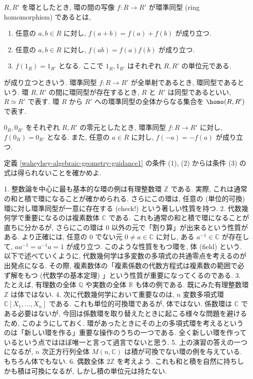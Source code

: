 \documentclass[openany, a4paper, oneside]{jsbook}
\begin{document}
\begin{defn}[環準同型]\label{waheyhey-algebraic-geometry-guidance1}
$R,R'$ を環としたとき, 環の間の写像 $f \colon R \to R'$ が環準同型 (ring homomorphism) であるとは,
\begin{enumerate}
\item 任意の $a,b \in R$ に対し, $f (a+b)=f (a) +f (b)$ が成り立つ.
\item 任意の $a,b\in R$ に対し, $f (ab)=f (a) f (b)$ が成り立つ.
\item $f (1_R)=1_{R'}$ となる.
ここで $1_R, 1_{R'}$ はそれぞれ $R, R'$ の単位元である.
\end{enumerate}
が成り立つときいう.
環準同型 $f \colon R \to R'$ が全単射であるとき, 環同型であるという.
環 $R,R'$ の間に環同型が存在するとき, $R$ と $R'$ は同型であるといい, $R \simeq R'$ で表す.
環 $R$ から $R'$ への環準同型の全体からなる集合を $\homo (R,R')$ で表す.
\end{defn}
\begin{exercise}
$0_R, 0_{R'}$ をそれぞれ $R, R'$ の零元としたとき,
環準同型 $f:R\to R'$ に対し, $f (0_R)=0_{R'}$ となる.
また, 任意の $a \in R$ に対し, $f (-a)=-f (a)$ が成り立つ. \fin
\end{exercise}
\begin{exercise}
定義 \ref{waheyhey-algebraic-geometry-guidance1} の条件 (1), (2) からは条件 (3) の式は得られないことを確かめよ. \fin
\end{exercise}
\begin{ex}
1. 整数論を中心に最も基本的な環の例は有理整数環 $\mathbb{Z}$ である.
   実際, これは通常の和と積で環になることが確かめられる.
   さらにこの環は, 任意の (単位的可換) 環に対し環準同型が一意に存在する (check!) という著しい性質を持つ.
2. 代数幾何学で重要になるのは複素数体 $\mathbb{C}$ である.
   これも通常の和と積で環になることが直ちに分かるが, さらにこの環は $0$ 以外の元で「割り算」が出来るという性質がある.
   より正確には, 任意の $0$ でない元 $0 \neq a \in \mathbb{C}$ に対し,
   ある $a^{-1} \in \mathbb{C}$ が存在して,  $aa^{-1}=a^{-1}a=1$ が成り立つ.
   このような性質をもつ環を, 体 (field) という.
   以下で述べていくように, 代数幾何学は多変数の多項式の共通零点を考えるのが出発点になる.
   その際, 複素数体の「複素係数の代数方程式は複素数の範囲で必ず解をもつ (代数学の基本定理) 」という性質が重要になってくるのである.
3. たとえば, 有理数の全体 $\mathbb{Q}$ や実数の全体 $\mathbb{R}$ も体の例である.
   既にみた有理整数環 $\mathbb{Z}$ は体ではない.
4. 次に代数幾何学において重要なのは,  $n$ 変数多項式環 $\mathbb{C}[X_1,\dots,X_n]$ である.
   これも単位的可換環であるが, 体ではない.
   係数環は $\mathbb{C}$ である必要はないが,
   今回は係数環を取り替えたときに起こる様々な問題を避けるため, このようにしておく.
   環があったときにその上の多項式環を考えるというのは「新しい環を作る」重要な操作のうちの一つである.
   全く新しい環を作っているという点ではほぼ唯一と言って過言でないと思う.
5. 上の演習の答えの一つになるが,  $n$ 次正方行列全体 $M (n,\mathbb{C})$ は積が可換でない環の例を与えている.
   もちろん体でもない.
6. 偶数全体 $2\mathbb{Z}$ を考えよう.
   これも和と積を自然に持ちしかも積は可換になるが, しかし積の単位元は持たない. \fin
\end{ex}
\end{document}
